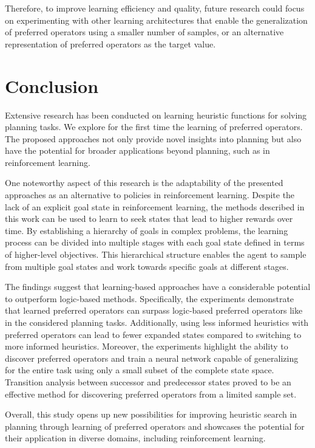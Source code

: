 \documentclass[ppgc,diss,english]{iiufrgs}
\begin{document}
Therefore, to improve learning efficiency and quality, future research could focus on experimenting with other learning architectures that enable the generalization of preferred operators using a smaller number of samples, or an alternative representation of preferred operators as the target value.

\chapter{Conclusion}
\label{cha:conclusion}
Extensive research has been conducted on learning heuristic functions for solving planning tasks. We explore for the first time the learning of preferred operators. The proposed approaches not only provide novel insights into planning but also have the potential for broader applications beyond planning, such as in reinforcement learning.

One noteworthy aspect of this research is the adaptability of the presented approaches as an alternative to policies in reinforcement learning. Despite the lack of an explicit goal state in reinforcement learning, the methods described in this work can be used to learn to seek states that lead to higher rewards over time. By establishing a hierarchy of goals in complex problems, the learning process can be divided into multiple stages with each goal state defined in terms of higher-level objectives. This hierarchical structure enables the agent to sample from multiple goal states and work towards specific goals at different stages.

The findings suggest that learning-based approaches have a considerable potential to outperform logic-based methods. Specifically, the experiments demonstrate that learned preferred operators can surpass logic-based preferred operators like \poff in the considered planning tasks. Additionally, using less informed heuristics with preferred operators can lead to fewer expanded states compared to switching to more informed heuristics. Moreover, the experiments highlight the ability to discover preferred operators and train a neural network capable of generalizing for the entire task using only a small subset of the complete state space. Transition analysis between successor and predecessor states proved to be an effective method for discovering preferred operators from a limited sample set.

Overall, this study opens up new possibilities for improving heuristic search in planning through learning of preferred operators and showcases the potential for their application in diverse domains, including reinforcement learning.
\end{document}

